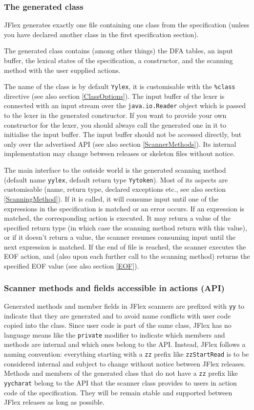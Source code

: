 \documentclass[11pt]{scrartcl}
\begin{document}
\subsubsection{The generated class}
JFlex generates exactly one file containing one class from the specification
(unless you have declared another class in the first specification section).

The generated class contains (among other things) the DFA tables, an input buffer, 
the lexical states of the specification, a constructor, and the scanning method
with the user supplied actions.

The name of the class is by default \texttt{Yylex}, it is customisable
with the \texttt{\%class} directive (see also section
\ref{ClassOptions}). The input buffer of the lexer is connected with an
input stream over the \texttt{java.io.Reader} object which is passed
to the lexer in the generated constructor. If you want to provide your
own constructor for the lexer, you should always call the generated
one in it to initialise the input buffer. The input buffer should not
be accessed directly, but only over the advertised API (see also
section \ref{ScannerMethods}). Its internal implementation may change
between releases or skeleton files without notice.

The main interface to the outside world is the generated scanning
method (default name \texttt{yylex}, default return type
\texttt{Yytoken}). Most of its aspects are customisable (name, return
type, declared exceptions etc., see also section
\ref{ScanningMethod}).  If it is called, it will consume input until
one of the expressions in the specification is matched or an error
occurs. If an expression is matched, the corresponding action is
executed. It may return a value of the specified return type (in which
case the scanning method return with this value), or if it doesn't
return a value, the scanner resumes consuming input until the next
expression is matched. If the end of file is reached, the scanner
executes the EOF action, and (also upon each further call to the scanning
method) returns the specified EOF value (see also section \ref{EOF}).


\subsubsection{Scanner methods and fields accessible in actions (API)\label{ScannerMethods}}
Generated methods and member fields in JFlex scanners are prefixed
with \texttt{yy} to indicate that they are generated and to avoid name
conflicts with user code copied into the class. Since user code is
part of the same class, JFlex has no language means like the
\texttt{private} modifier to indicate which members and methods are
internal and which ones belong to the API. Instead, JFlex follows a
naming convention: everything starting with a \texttt{zz} prefix like
\texttt{zzStartRead} is to be considered internal and subject to
change without notice between JFlex releases. Methods and members of
the generated class that do not have a \texttt{zz} prefix like
\texttt{yycharat} belong to the API that the scanner class provides to
users in action code of the specification. They will be remain stable
and supported between JFlex releases as long as possible.
\end{document}
